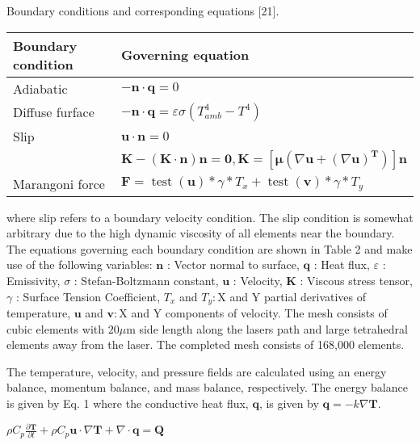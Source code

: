 \documentclass[10pt]{article}
\begin{document}
Boundary conditions and corresponding equations [21].

\begin{center}
\begin{tabular}{ll}
\hline
Boundary condition & Governing equation \\
\hline
Adiabatic & $-\boldsymbol{n} \cdot \boldsymbol{q}=0$ \\
Diffuse furface & $-\boldsymbol{n} \cdot \boldsymbol{q}=\varepsilon \sigma\left(T_{a m b}^{4}-T^{4}\right)$ \\
Slip & $\boldsymbol{u} \cdot \boldsymbol{n}=0$ \\
 & $\boldsymbol{K}-(\boldsymbol{K} \cdot \boldsymbol{n}) \boldsymbol{n}=\boldsymbol{0}, \boldsymbol{K}=\left[\boldsymbol{\mu}\left(\nabla \boldsymbol{u}+(\nabla \boldsymbol{u})^{\boldsymbol{T}}\right)\right] \boldsymbol{n}$ \\
Marangoni force & $\boldsymbol{F}=\operatorname{test}(\mathbf{u}) * \gamma * T_{x}+\operatorname{test}(\mathbf{v}) * \gamma * T_{y}$ \\
\end{tabular}
\end{center}

where slip refers to a boundary velocity condition. The slip condition is somewhat arbitrary due to the high dynamic viscosity of all elements near the boundary. The equations governing each boundary condition are shown in Table 2 and make use of the following variables: $\boldsymbol{n}$ : Vector normal to surface, $\boldsymbol{q}$ : Heat flux, $\varepsilon$ : Emissivity, $\sigma$ : Stefan-Boltzmann constant, $\boldsymbol{u}$ : Velocity, $\boldsymbol{K}$ : Viscous stress tensor, $\gamma$ : Surface Tension Coefficient, $T_{x}$ and $T_{y}: \mathrm{X}$ and $\mathrm{Y}$ partial derivatives of temperature, $\mathbf{u}$ and $\mathbf{v}: \mathrm{X}$ and $\mathrm{Y}$ components of velocity. The mesh consists of cubic elements with $20 \mu \mathrm{m}$ side length along the lasers path and large tetrahedral elements away from the laser. The completed mesh consists of 168,000 elements.

The temperature, velocity, and pressure fields are calculated using an energy balance, momentum balance, and mass balance, respectively. The energy balance is given by Eq. 1 where the conductive heat flux, $\boldsymbol{q}$, is given by $\boldsymbol{q}=-k \nabla \boldsymbol{T}$.

$\rho C_{p} \frac{\partial \boldsymbol{T}}{\partial t}+\rho C_{p} \boldsymbol{u} \cdot \nabla \mathbf{T}+\nabla \cdot \mathbf{q}=\mathbf{Q}$
\end{document}
